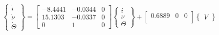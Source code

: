 \documentclass{article}
\begin{document}
\begin{equation}
\label{eq:statesval}
\begin{Bmatrix}
\dot{i}\\ \dot{\nu} \\ \dot{\Theta} 
\end{Bmatrix} =
\begin{bmatrix}
-8.4441 & -0.0344 & 0\\
15.1303 & -0.0337 & 0\\
0 & 1 & 0
\end{bmatrix}
\begin{Bmatrix}
i\\ \nu \\ \Theta 
\end{Bmatrix} + 
\begin{bmatrix}
0.6889 & 0 & 0\\
\end{bmatrix}
\begin{Bmatrix}
V 
\end{Bmatrix}
\end{equation}
\end{document}
